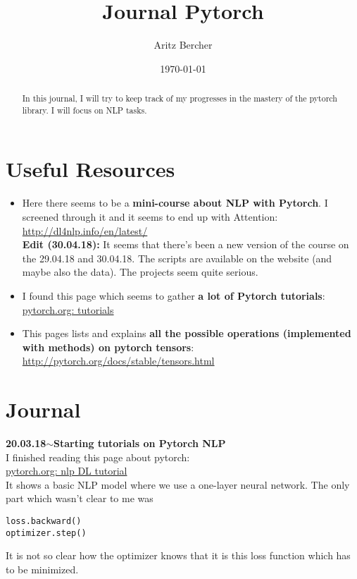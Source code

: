 \documentclass[11pt,a4paper]{article}
\title{Journal Pytorch}
\author{Aritz Bercher}
\date{\today}
\newenvironment{loggentry}[2]%
{\noindent\textbf{#1}\hspace{1cm}$\mathbf{\sim}$\text{ }\textbf{#2}\\}{\vspace{0.5cm}}
\begin{document}
\maketitle

\begin{abstract}
In this journal, I will try to keep track of my progresses in the mastery of the pytorch library. I will focus on NLP tasks.\\
\end{abstract}

\section{Useful Resources}
\begin{itemize}
\item Here there seems to be a \textbf{mini-course about NLP with Pytorch}. I screened through it and it seems to end up with Attention:\\
\url{http://dl4nlp.info/en/latest/}\\
\textbf{Edit (30.04.18):} It seems that there's been a new version of the course on the 29.04.18 and 30.04.18. The scripts are available on the website (and maybe also the data). The projects seem quite serious.
\item I found this page which seems to gather \textbf{a lot of Pytorch tutorials}:\\
\href{http://pytorch.org/tutorials/}{pytorch.org: tutorials}\\
\item This pages lists and explains \textbf{all the possible operations (implemented with methods) on pytorch tensors}:\\
\url{http://pytorch.org/docs/stable/tensors.html}\\
\end{itemize}

\section{Journal}

\begin{loggentry}{20.03.18}{Starting tutorials on Pytorch NLP}
I finished reading this page about pytorch:\\
\href{http://pytorch.org/tutorials/beginner/nlp/deep_learning_tutorial.html}{pytorch.org: nlp DL tutorial}\\
It shows a basic NLP model where we use a one-layer neural network. The only part which wasn't clear to me was
\begin{verbatim}
loss.backward()
optimizer.step()
\end{verbatim}
It is not so clear how the optimizer knows that it is this loss function which has to be minimized.
\end{loggentry}
\end{document}
